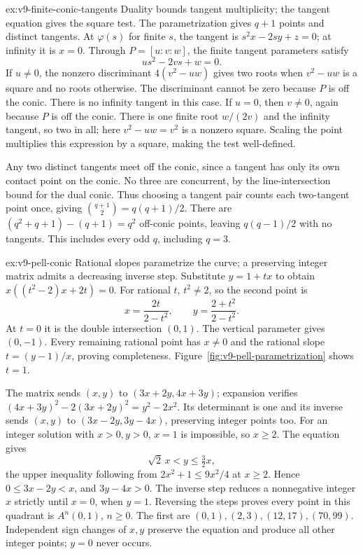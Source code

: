 \begin{solution}{ex:v9-finite-conic-tangents}
\idea Duality bounds tangent multiplicity; the tangent equation gives the square test.
\writeup The parametrization gives $q+1$ points and distinct tangents. At $\varphi(s)$ for finite $s$, the tangent is $s^2x-2sy+z=0$; at infinity it is $x=0$. Through $P=[u:v:w]$, the finite tangent parameters satisfy
\[
us^2-2vs+w=0.
\]
If $u\ne0$, the nonzero discriminant $4(v^2-uw)$ gives two roots when $v^2-uw$ is a square and no roots otherwise. The discriminant cannot be zero because $P$ is off the conic. There is no infinity tangent in this case. If $u=0$, then $v\ne0$, again because $P$ is off the conic. There is one finite root $w/(2v)$ and the infinity tangent, so two in all; here $v^2-uw=v^2$ is a nonzero square. Scaling the point multiplies this expression by a square, making the test well-defined.

Any two distinct tangents meet off the conic, since a tangent has only its own contact point on the conic. No three are concurrent, by the line-intersection bound for the dual conic. Thus choosing a tangent pair counts each two-tangent point once, giving $\binom{q+1}{2}=q(q+1)/2$. There are $(q^2+q+1)-(q+1)=q^2$ off-conic points, leaving $q(q-1)/2$ with no tangents. This includes every odd $q$, including $q=3$.
\end{solution}
\begin{solution}{ex:v9-pell-conic}
\idea Rational slopes parametrize the curve; a preserving integer matrix admits a decreasing inverse step.
\writeup Substitute $y=1+tx$ to obtain $x((t^2-2)x+2t)=0$. For rational $t$, $t^2\ne2$, so the second point is
\[
x=\frac{2t}{2-t^2},\qquad y=\frac{2+t^2}{2-t^2}.
\]
At $t=0$ it is the double intersection $(0,1)$. The vertical parameter gives $(0,-1)$. Every remaining rational point has $x\ne0$ and the rational slope $t=(y-1)/x$, proving completeness. Figure~\ref{fig:v9-pell-parametrization} shows $t=1$.

The matrix sends $(x,y)$ to $(3x+2y,4x+3y)$; expansion verifies $(4x+3y)^2-2(3x+2y)^2=y^2-2x^2$. Its determinant is one and its inverse sends $(x,y)$ to $(3x-2y,3y-4x)$, preserving integer points too. For an integer solution with $x>0,y>0$, $x=1$ is impossible, so $x\ge2$. The equation gives
\[
\sqrt2\,x<y\le\tfrac32x,
\]
the upper inequality following from $2x^2+1\le9x^2/4$ at $x\ge2$. Hence $0\le3x-2y<x$, and $3y-4x>0$. The inverse step reduces a nonnegative integer $x$ strictly until $x=0$, when $y=1$. Reversing the steps proves every point in this quadrant is $A^n(0,1)$, $n\ge0$. The first are $(0,1),(2,3),(12,17),(70,99)$. Independent sign changes of $x,y$ preserve the equation and produce all other integer points; $y=0$ never occurs.
\end{solution}
